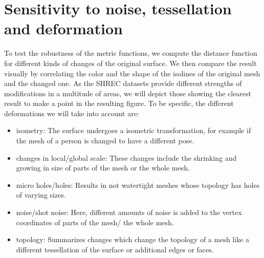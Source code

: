 \section{Sensitivity to noise, tessellation and deformation}
To test the robustness of the metric functions, we compute the distance function for different kinds of changes of the original surface.
We then compare the result visually by correlating the color and the shape of the isolines of the original mesh and the changed one.
As the SHREC datasets provide different strengths of modifications in a multitude of areas, we will depict those showing the clearest result to make a point in the resulting figure.
To be specific, the different deformations we will take into account are:
\begin{itemize}
	\item isometry: The surface undergoes a isometric transformation, for example if the mesh of a person is changed to have a different pose.
	\item changes in local/global scale: These changes include the shrinking and growing in size of parts of the mesh or the whole mesh.
	\item micro holes/holes: Results in not watertight meshes whose topology has holes of varying sizes.
	\item noise/shot noise: Here, different amounts of noise is added to the vertex coordinates of parts of the mesh/ the whole mesh.
	\item topology: Summarizes changes which change the topology of a mesh like a different tessellation of the surface or  additional edges or faces.
\end{itemize}


